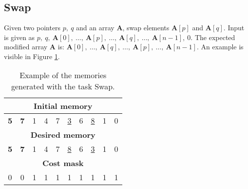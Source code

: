 \subsection{Swap}
Given two pointers $p,\ q$ and an array \textbf{A}, swap elements $\textbf{A}[p]$ and $\textbf{A}[q]$. Input is given as $p,\ q,\ \textbf{A}[0],\ \dots,\ \textbf{A}[p],\ \dots,\ \textbf{A}[q],\ \dots,\ \textbf{A}[n-1],\ 0$. The expected modified array \textbf{A} is: $\textbf{A}[0],\ \dots,\ \textbf{A}[q],\ \dots,\ \textbf{A}[p],\ \dots,\ \textbf{A}[n-1]$. An example is visible in Figure \ref{fig:swap-example}.
\begin{table}[h!]
	\centering
	\begin{tabular}{|c|c|c|c|c|c|c|c|c|c|}
		\hline
		\multicolumn{10}{|c|}{\textbf{Initial memory}} \\ \hline
		\textbf{5} & \textbf{7} & 1 & 4 & 7 & \underline{3} & 6 & \underline{8} & 1 & 0 \\ \hline\hline\hline
		\multicolumn{10}{|c|}{\textbf{Desired memory}} \\ \hline
		\textbf{5} & \textbf{7} & 1 & 4 & 7 & \underline{8} & 6 & \underline{3} & 1 & 0 \\ \hline\hline\hline
		\multicolumn{10}{|c|}{\textbf{Cost mask}} \\ \hline
		0 & 0 & 1 & 1 & 1 & 1 & 1 & 1 & 1 & 1 \\ \hline
	\end{tabular}
	\caption{Example of the memories generated with the task Swap.}
	\label{fig:swap-example}
\end{table}
\FloatBarrier

